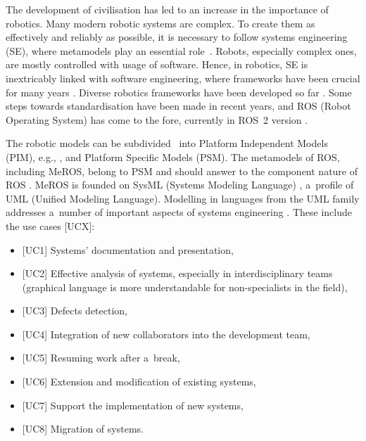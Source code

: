 \documentclass[11pt,oneside,a4paper]{report}
\begin{document}
	The development of civilisation has led to an increase in the importance of robotics. Many modern robotic systems are complex. To create them as effectively and reliably as possible, it is necessary to follow systems engineering (SE), where metamodels play an essential role~\cite{bezivin2004search,kent2002model,schmidt2006model}.
	Robots, especially complex ones, are mostly controlled with usage of software. Hence, in robotics, SE is inextricably linked with software engineering, where frameworks have been crucial for many years \cite{mnkandla2009software,shehory2014agent}.
	Diverse robotics frameworks have been developed so far \cite{hentout2016survey,inigo2012robotics,tsardoulias2017robotic}. Some steps towards standardisation have been made in recent years, and ROS (Robot Operating System) has come to the fore, currently in ROS~2 version \cite{maruyama2016exploring,park2020real}.   
	
	The robotic models can be subdivided~\cite{de2021survey} into Platform Independent Models (PIM), e.g., \cite{tasker2020,earl2020,zielinski2010motion,zielinski2017variable}, and Platform Specific Models (PSM). The metamodels of ROS, including MeROS, belong to PSM and should answer to the component nature of ROS \cite{Figat:2022:RAS,wenger2016model}.
	 MeROS is founded on SysML (Systems Modeling Language) \cite{Friedenthal:2015,omg-sysml17}, a~profile of UML (Unified Modeling Language). Modelling in languages from the UML family addresses a~number of important aspects of systems engineering \cite{chaudron2012effective}. These include the use cases [UCX]:
	\begin{itemize}
		\item $[$UC1] Systems' documentation and presentation,
		\item $[$UC2] Effective analysis of systems, especially in interdisciplinary teams (graphical language is more understandable for non-specialists in the field), 
		\item $[$UC3] Defects detection,
		\item $[$UC4] Integration of new collaborators into the development team,
		\item $[$UC5] Resuming work after a~break,
		\item $[$UC6] Extension and modification of existing systems,
		\item $[$UC7] Support the implementation of new systems,
		\item $[$UC8] Migration of systems.
	\end{itemize}
	
\end{document}
